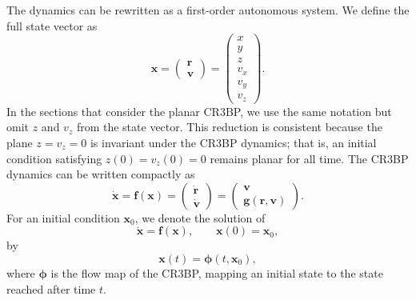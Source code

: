 The dynamics can be rewritten as a first-order autonomous system. We define the full state vector as
\begin{equation} \label{eq:stateVector}
    \boldsymbol{x}
    =
    \begin{pmatrix}
    \boldsymbol{r} \\
    \boldsymbol{v}
    \end{pmatrix}
    =
    \begin{pmatrix}
    x \\ y \\ z \\ v_x \\ v_y \\ v_z
    \end{pmatrix}.
\end{equation}
In the sections that consider the planar CR3BP, we use the same notation but omit $z$ and $v_z$ from the state vector.
This reduction is consistent because the plane $z=v_z=0$ is invariant under the CR3BP dynamics; that is, an initial condition satisfying $z(0)=v_z(0)=0$ remains planar for all time.
The CR3BP dynamics can be written compactly as
\begin{equation}
    \dot{\boldsymbol{x}}
    =
    \boldsymbol{f}(\boldsymbol{x})
    =
    \begin{pmatrix}
        \dot{\boldsymbol{r}} \\
        \dot{\boldsymbol{v}}
    \end{pmatrix}
    =
    \begin{pmatrix}
        \boldsymbol{v} \\
        \boldsymbol{g}(\boldsymbol{r},\boldsymbol{v})
    \end{pmatrix}.
    \label{eq:cr3bp_first_order}
\end{equation}
For an initial condition $\boldsymbol{x}_0$, we denote the solution of
\begin{equation*}
    \dot{\boldsymbol{x}} = \boldsymbol{f}(\boldsymbol{x}),
    \qquad
    \boldsymbol{x}(0)=\boldsymbol{x}_0,
\end{equation*}
by
\begin{equation*}
    \boldsymbol{x}(t) = \boldsymbol{\phi}(t,\boldsymbol{x}_0),
\end{equation*}
where $\boldsymbol{\phi}$ is the flow map of the CR3BP, mapping an initial state to the state reached after time $t$.


